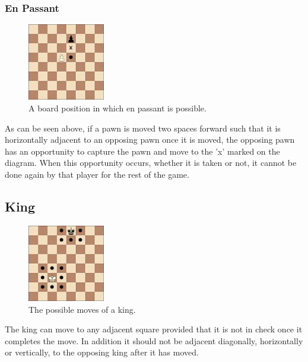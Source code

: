 \subsubsection{En Passant}
\begin{figure}[H]
\centering
	\includegraphics[width=0.3\textwidth]{images/boards/en_passant}
	\caption{A board position in which en passant is possible.}
\end{figure}
As can be seen above, if a pawn is moved two spaces forward such that it is horizontally adjacent to an opposing pawn once it is moved, the opposing pawn has an opportunity to capture the pawn and move to the 'x' marked on the diagram. When this opportunity occurs, whether it is taken or not, it cannot be done again by that player for the rest of the game.
\subsection{King}
\begin{figure}[H]
\centering
	\includegraphics[width=0.3\textwidth]{images/boards/king_movement}
	\caption{The possible moves of a king.}
\end{figure}
The king can move to any adjacent square provided that it is not in check once it completes the move. In addition it should not be adjacent diagonally, horizontally or vertically, to the opposing king after it has moved. 
